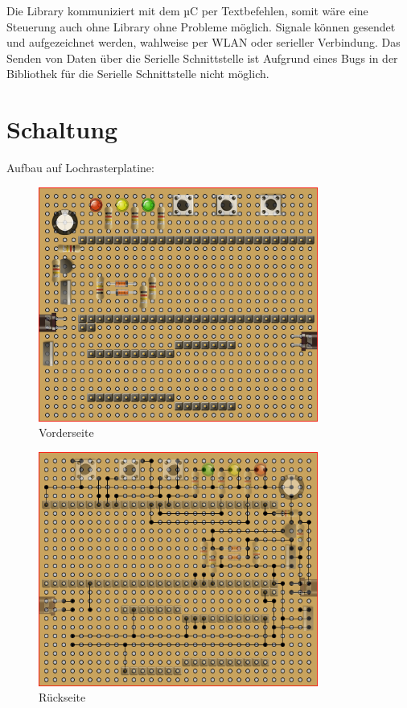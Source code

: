\documentclass[11pt,a4paper,bibtotoc,oneside]{scrbook}
\begin{document}
Die Library kommuniziert mit dem µC per Textbefehlen, somit wäre eine Steuerung auch ohne Library ohne Probleme möglich.
Signale können gesendet und aufgezeichnet werden, wahlweise per WLAN oder serieller Verbindung. Das Senden von Daten über die 
Serielle Schnittstelle ist Aufgrund eines Bugs in der Bibliothek für die Serielle Schnittstelle nicht möglich.

\section{Schaltung}
Aufbau auf Lochrasterplatine:
  \begin{figure}[!ht]
    \centering
        \includegraphics[width=260pt]{./picture/front.png}
        \caption{\label{lm324}{Vorderseite}}
    \end{figure}
    
    \begin{figure}[!ht]
    \centering
        \includegraphics[width=260pt]{./picture/back.png}
        \caption{\label{lm324}{Rückseite}}
    \end{figure}
    
\end{document}
